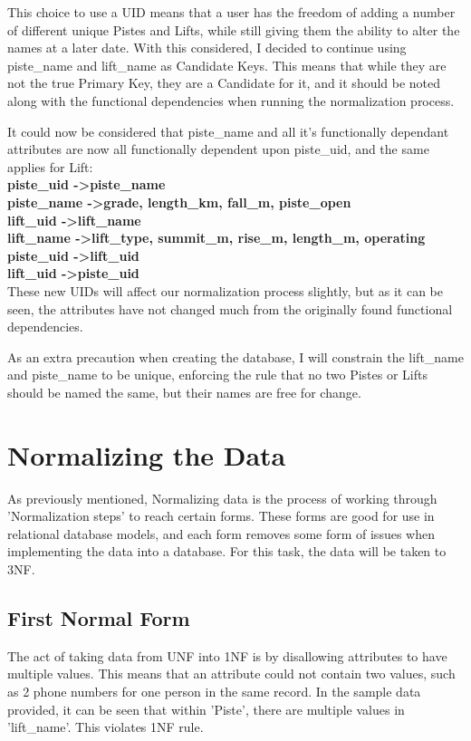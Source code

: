 \documentclass[11pt]{scrartcl} %
\begin{document}
This choice to use a UID means that a user has the freedom of adding a number of different unique Pistes and Lifts, while still giving them the ability to alter the names at a later date. With this considered, I decided to continue using piste\_name and lift\_name as Candidate Keys. This means that while they are not the true Primary Key, they are a Candidate for it, and it should be noted along with the functional dependencies when running the normalization process.

It could now be considered that piste\_name and all it's functionally dependant attributes are now all functionally dependent upon piste\_uid, and the same applies for Lift:\\[0.3cm]
\textbf{piste\_uid -\textgreater \space piste\_name}\\
\textbf{piste\_name -\textgreater \space grade, length\_km, fall\_m, piste\_open}\\[0.3cm]
\textbf{lift\_uid -\textgreater \space lift\_name}\\
\textbf{lift\_name -\textgreater \space lift\_type, summit\_m, rise\_m, length\_m, operating}\\[0.3cm]
\textbf{piste\_uid -\textgreater \space lift\_uid}\\
\textbf{lift\_uid -\textgreater \space piste\_uid}
\\[0.3cm]
These new UIDs will affect our normalization process slightly, but as it can be seen, the attributes have not changed much from the originally found functional dependencies.

As an extra precaution when creating the database, I will constrain the lift\_name and piste\_name to be unique, enforcing the rule that no two Pistes or Lifts should be named the same, but their names are free for change.

\newpage

\section{Normalizing the Data}
As previously mentioned, Normalizing data is the process of working through 'Normalization steps' to reach certain forms. These forms are good for use in relational database models, and each form removes some form of issues when implementing the data into a database. For this task, the data will be taken to 3NF.

\subsection{First Normal Form}
The act of taking data from UNF into 1NF is by disallowing attributes to have multiple values. This means that an attribute could not contain two values, such as 2 phone numbers for one person in the same record. In the sample data provided, it can be seen that within 'Piste', there are multiple values in 'lift\_name'. This violates 1NF rule.
\end{document}
